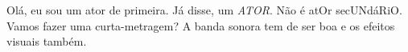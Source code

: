 \documentclass{article}
\begin{document}
Olá, eu sou um ator de primeira. Já disse, um \emph{ATOR}. Não é atOr secUNdáRiO.
Vamos fazer uma curta-metragem?
A banda sonora tem de ser boa e os efeitos visuais também.
\end{document}
